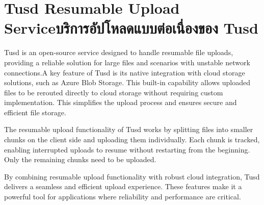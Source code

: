 \section{\ifenglish Tusd Resumable Upload Service\else บริการอัปโหลดแบบต่อเนื่องของ Tusd\fi}
Tusd is an open-source service designed to handle resumable file uploads, providing a reliable solution for large files and scenarios with unstable network connections.\enskip A key feature of Tusd is its native integration with cloud storage solutions, such as Azure Blob Storage. This built-in capability allows uploaded files to be rerouted directly to cloud storage without requiring custom implementation. This simplifies the upload process and ensures secure and efficient file storage.

The resumable upload functionality of Tusd works by splitting files into smaller chunks on the client side and uploading them individually. Each chunk is tracked, enabling interrupted uploads to resume without restarting from the beginning. Only the remaining chunks need to be uploaded.

By combining resumable upload functionality with robust cloud integration, Tusd delivers a seamless and efficient upload experience. These features make it a powerful tool for applications where reliability and performance are critical.
